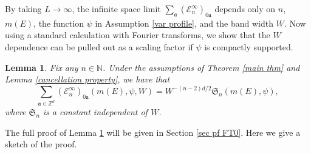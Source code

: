 \documentclass{article}
\newcommand{\1}{\mathds{1}}
\numberwithin{equation}{section}
\newcommand{\be}{\begin{equation}}
\newcommand{\ee}{\end{equation}}
\newcommand{\fa}{{\mathfrak a}}
\renewcommand{\leq}{\leqslant}
\renewcommand{\le}{\leq}
\newcommand{\N}{\mathbb{N}}
\newcommand{\Z}{\mathbb{Z}}
\theoremstyle{plain} %
\newtheorem{lemma}[theorem]{Lemma}
\theoremstyle{remark}
\newcommand{\Sele}{{\mathcal E}}
\newcommand{\Sint}{\mathfrak S}
\begin{document}
By taking $L\to \infty$, the infinite space limit $\sum_\fa  (\Sele^{\infty}_{n})_{0\fa}$ depends only on $n$, $m(E)$, the function $\psi$ in Assumption \ref{var profile}, and the band width $W$. Now using a standard calculation with Fourier transforms, we show that the $W$ dependence can be pulled out as a scaling factor if $\psi$ is compactly supported. 


\begin{lemma}\label{lem FT0}
Fix any $n\in \N$. Under the assumptions of Theorem \ref{main thm} and Lemma \ref{cancellation property},
we have that %
\be\label{eq FT0} \sum_{\fa\in \Z^d}( \Sele^{\infty}_{n})_{0\fa }(m(E), \psi, W) =W^{-(n-2)d/2} {\Sint}_{n}(m(E), \psi)  ,\ee
where ${\Sint}_{n}$ is a constant independent of   $W$. %
\end{lemma}
The full proof of Lemma \ref{lem FT0} will be given in Section \ref{sec pf FT0}. Here we give a sketch of the proof. %
\end{document}

